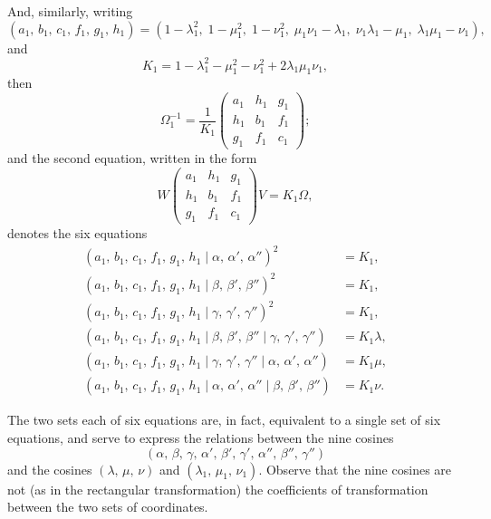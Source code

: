 \documentclass[11pt]{article}
\begin{document}
And, similarly, writing
\[
   (a_1,\, b_1,\, c_1,\, f_1,\, g_1,\, h_1) = (1 - \lambda_1^2,\; 1 - \mu_1^2,\; 1 - \nu_1^2,\; \mu_1\nu_1 - \lambda_1,\; \nu_1\lambda_1 - \mu_1,\; \lambda_1\mu_1 - \nu_1),
\]
and
\[
   K_1 = 1 - \lambda_1^2 - \mu_1^2 - \nu_1^2 + 2\lambda_1\mu_1\nu_1,
\]
then
\[
   \Omega_1^{-1} = \frac{1}{K_1}\begin{pmatrix} a_1 & h_1 & g_1 \\ h_1 & b_1 & f_1 \\ g_1 & f_1 & c_1 \end{pmatrix};
\]
and the second equation, written in the form
\[
   W\!\begin{pmatrix} a_1 & h_1 & g_1 \\ h_1 & b_1 & f_1 \\ g_1 & f_1 & c_1 \end{pmatrix}\!V = K_1 \Omega,
\]
denotes the six equations
\begin{align*}
   (a_1,\, b_1,\, c_1,\, f_1,\, g_1,\, h_1 \mid \alpha,\, \alpha',\, \alpha'')^2 &= K_1,\\
   (a_1,\, b_1,\, c_1,\, f_1,\, g_1,\, h_1 \mid \beta,\, \beta',\, \beta'')^2 &= K_1,\\
   (a_1,\, b_1,\, c_1,\, f_1,\, g_1,\, h_1 \mid \gamma,\, \gamma',\, \gamma'')^2 &= K_1,\\
   (a_1,\, b_1,\, c_1,\, f_1,\, g_1,\, h_1 \mid \beta,\, \beta',\, \beta'' \mid \gamma,\, \gamma',\, \gamma'') &= K_1\lambda,\\
   (a_1,\, b_1,\, c_1,\, f_1,\, g_1,\, h_1 \mid \gamma,\, \gamma',\, \gamma'' \mid \alpha,\, \alpha',\, \alpha'') &= K_1\mu,\\
   (a_1,\, b_1,\, c_1,\, f_1,\, g_1,\, h_1 \mid \alpha,\, \alpha',\, \alpha'' \mid \beta,\, \beta',\, \beta'') &= K_1\nu.
\end{align*}

The two sets each of six equations are, in fact, equivalent to a single set of six
equations, and serve to express the relations between the nine cosines
\[
   (\alpha,\, \beta,\, \gamma,\, \alpha',\, \beta',\, \gamma',\, \alpha'',\, \beta'',\, \gamma'')
\]
and the cosines $(\lambda,\, \mu,\, \nu)$ and $(\lambda_1,\, \mu_1,\, \nu_1)$. Observe that the nine cosines are not
(as in the rectangular transformation) the coefficients of transformation between the
two sets of coordinates.
\end{document}
